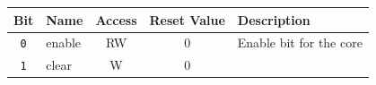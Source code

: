 \begin{table}
\begin{longtable}[]{@{}clccl@{}}
	\begin{minipage}[b]{0.13\columnwidth}\centering\strut
		\textbf{Bit}\strut
		\end{minipage} & \begin{minipage}[b]{0.08\columnwidth}\raggedright\strut
		\textbf{Name}\strut
		\end{minipage} & \begin{minipage}[b]{0.12\columnwidth}\centering\strut
		\textbf{Access}\strut
		\end{minipage} & \begin{minipage}[b]{0.17\columnwidth}\centering\strut
		\textbf{Reset Value}\strut
		\end{minipage} & \begin{minipage}[b]{0.15\columnwidth}\raggedright\strut
		\textbf{Description}\strut
		\end{minipage}\tabularnewline
		\endhead
		\begin{minipage}[t]{0.13\columnwidth}\centering\strut
			\texttt{0}\strut
			\end{minipage} & \begin{minipage}[t]{0.08\columnwidth}\raggedright\strut
			enable\strut
			\end{minipage} & \begin{minipage}[t]{0.12\columnwidth}\centering\strut
			RW\strut
			\end{minipage} & \begin{minipage}[t]{0.17\columnwidth}\centering\strut
			0\strut
			\end{minipage} & \begin{minipage}[t]{0.15\columnwidth}\raggedright\strut
			Enable bit for the core\strut
			\end{minipage}\tabularnewline
			\begin{minipage}[t]{0.13\columnwidth}\centering\strut
				\texttt{1}\strut
				\end{minipage} & \begin{minipage}[t]{0.08\columnwidth}\raggedright\strut
				clear\strut
				\end{minipage} & \begin{minipage}[t]{0.12\columnwidth}\centering\strut
				W\strut
				\end{minipage} & \begin{minipage}[t]{0.17\columnwidth}\centering\strut
				0\strut
				\end{minipage} & \begin{minipage}[t]{0.15\columnwidth}\raggedright\strut

\end{minipage}
\end{longtable}
\end{table}
